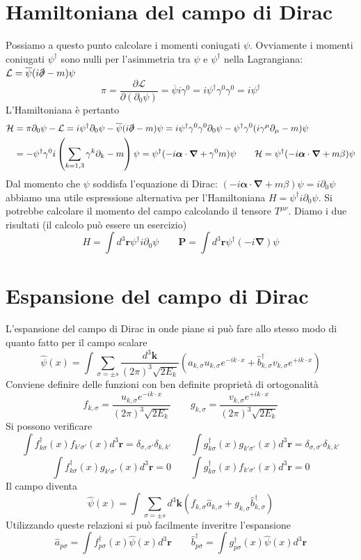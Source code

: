 \section{Hamiltoniana del campo di Dirac}
Possiamo a questo punto calcolare i momenti coniugati $\psi$. Ovviamente i momenti coniugati $\psi^\dagger$ sono nulli per l'asimmetria tra $\psi$ e $\psi^\dagger$ nella Lagrangiana: $\mathcal{L} = \overline{\psi}(i\slashed{\partial} - m)\psi$
$$
\pi = \frac{\partial\mathcal{L}}{\partial(\partial_0\psi)} = \overline{\psi}i\gamma^0 = i\psi^\dagger\gamma^0\gamma^0 = i\psi^\dagger
$$
L'Hamiltoniana è pertanto
\begin{align*}
    \mathcal{H} &= \pi\partial_0\psi - \mathcal{L} = i\psi^\dagger\partial_0\psi - \overline{\psi}(i\slashed{\partial} - m)\psi = i\psi^\dagger\gamma^0\gamma^0\partial_0\psi - \psi^\dagger\gamma^0(i\gamma^\mu\partial_\mu - m)\psi \\
    &= -\psi^\dagger\gamma^0 i \left( \sum_{k=1,3} \gamma^k\partial_k - m \right) \psi = \psi^\dagger (-i\boldsymbol{\alpha} \cdot \boldsymbol{\nabla} + \gamma^0 m) \psi \qquad \mathcal{H} = \psi^\dagger (-i\boldsymbol{\alpha} \cdot \boldsymbol{\nabla} + m\beta) \psi
\end{align*}
Dal momento che $\psi$ soddisfa l'equazione di Dirac: $(-i\boldsymbol{\alpha} \cdot \boldsymbol{\nabla} + m\beta)\psi = i\partial_0\psi$ abbiamo una utile espressione alternativa per l'Hamiltoniana $H=\psi^\dagger i \partial_0\psi$. Si potrebbe calcolare il momento del campo calcolando il tensore $T^{\mu\nu}$. Diamo i due risultati (il calcolo può essere un esercizio)
$$
H = \int d^3\mathbf{r} \psi^\dagger i\partial_0\psi \qquad \mathbf{P} = \int d^3\mathbf{r} \psi^\dagger (-i\boldsymbol{\nabla})\psi
$$
\section{Espansione del campo di Dirac}
L'espansione del campo di Dirac in onde piane si può fare allo stesso modo di quanto fatto per il campo scalare
$$
\hat{\psi}(x) = \int \sum_{\sigma=\pm s} \frac{d^3\mathbf{k}}{(2\pi)^3\sqrt{2E_k}} \left( \hat{a}_{k,\sigma} u_{k,\sigma} e^{-ik\cdot x} + \hat{b}_{k,\sigma}^\dagger v_{k,\sigma} e^{+ik\cdot x} \right)
$$
Conviene definire delle funzioni con ben definite proprietà di ortogonalità
$$
f_{k,\sigma} = \frac{u_{k,\sigma} e^{-ik\cdot x}}{(2\pi)^3\sqrt{2E_k}} \qquad g_{k,\sigma} = \frac{v_{k,\sigma} e^{+ik\cdot x}}{(2\pi)^3\sqrt{2E_k}}
$$
Si possono verificare
$$
\int f_{k\sigma}^\dagger(x) f_{k'\sigma'}(x) d^3\mathbf{r} = \delta_{\sigma,\sigma'}\delta_{k,k'} \qquad \int g_{k\sigma}^\dagger(x) g_{k'\sigma'}(x) d^3\mathbf{r} = \delta_{\sigma,\sigma'}\delta_{k,k'}
$$
$$
\int f_{k\sigma}^\dagger(x) g_{k'\sigma'}(x) d^3\mathbf{r} = 0 \qquad \int g_{k\sigma}^\dagger(x) f_{k'\sigma'}(x) d^3\mathbf{r} = 0
$$
Il campo diventa 
$$
\hat{\psi}(x) = \int \sum_{\sigma=\pm s} d^3\mathbf{k} (f_{k,\sigma} \hat{a}_{k,\sigma} + g_{k,\sigma} \hat{b}_{k,\sigma}^\dagger)
$$
Utilizzando queste relazioni si può facilmente inveritre l'espansione
$$
\hat{a}_{p\sigma} = \int f_{p\sigma}^\dagger(x) \hat{\psi}(x) d^3\mathbf{r} \qquad \hat{b}_{p\sigma}^\dagger = \int g_{p\sigma}^\dagger(x) \hat{\psi}(x) d^3\mathbf{r}
$$
